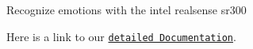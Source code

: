 Recognize emotions with the intel realsense sr300

Here is a link to our \href{https://cdn.rawgit.com/TheRDavid/RealSense/a2fed1bd/docs/doc.html}{\tt detailed Documentation}. 